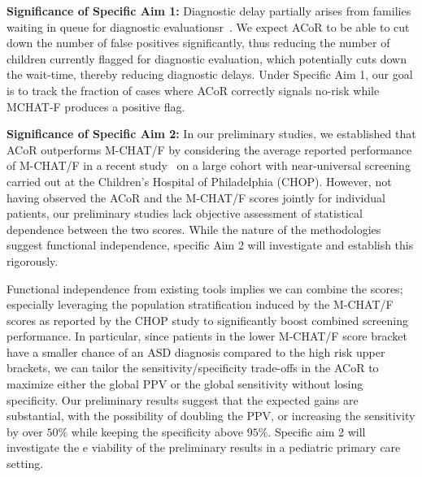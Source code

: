 \documentclass[onecolumn, compsoc,11pt]{IEEEtran}
\def\ZERO{ACoR\xspace}
\begin{document}


\textbf{Significance of Specific Aim 1:} 
Diagnostic delay partially arises from families waiting in queue for diagnostic evaluationsr~\cite{gordon2016whittling}. 
We expect \ZERO to be able to cut down the number of false positives significantly, thus reducing the number of children currently flagged for diagnostic evaluation, which potentially cuts down  the wait-time, thereby reducing diagnostic delays.  Under Specific Aim 1, our goal is to track the fraction of cases where \ZERO correctly signals no-risk while MCHAT-F produces a positive flag.

\textbf{Significance of Specific Aim 2:} 
In our preliminary studies, we established that \ZERO outperforms M-CHAT/F by considering the average reported performance of M-CHAT/F in a recent study~\cite{pmid31562252} on a large  cohort with near-universal screening carried out at the Children's Hospital of Philadelphia (CHOP). However, not having observed the \ZERO and the M-CHAT/F scores jointly for individual patients, our preliminary studies lack objective assessment of statistical dependence between the two scores. While the  nature of the methodologies  suggest functional independence, specific Aim 2 will investigate and establish this rigorously.

Functional independence from existing tools implies  we can   combine the scores; especially leveraging the population stratification induced by the M-CHAT/F scores as reported by the CHOP study to significantly boost combined screening performance. In particular, since patients in the lower M-CHAT/F score bracket have a smaller chance of an ASD diagnosis compared to the high risk upper brackets, we can tailor the sensitivity/specificity trade-offs in the \ZERO to maximize  either the global PPV or the global sensitivity without losing specificity. Our preliminary results suggest that the expected gains are substantial, with the possibility of doubling the PPV, or increasing the sensitivity by over $50\%$ while keeping the specificity above $95\%$. Specific aim 2 will investigate the e viability of the preliminary results in a pediatric primary care setting.
\end{document}
